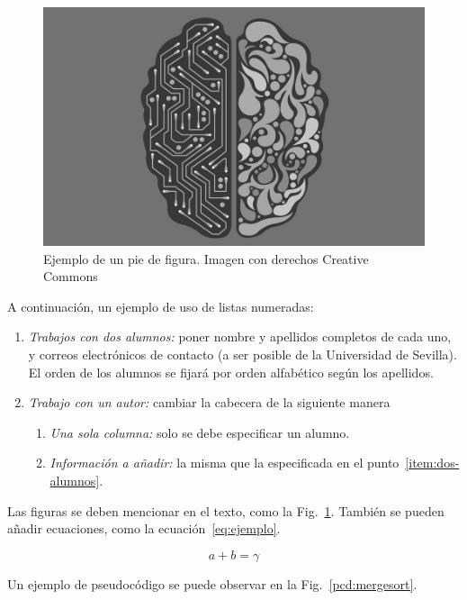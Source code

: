 \documentclass[conference,a4paper]{IEEEtran}
\def\figurename{Fig.}
\begin{document}
\begin{figure}
  \centering
  \includegraphics{ejemplo}
  \caption{Ejemplo de un pie de figura. Imagen con derechos Creative Commons}
  \label{fig:ejemplo}
\end{figure}

A continuación, un ejemplo de uso de listas numeradas:
\begin{enumerate}
\item\label{item:dos-alumnos} \textit{Trabajos con dos alumnos:} poner nombre y
  apellidos completos de cada uno, y correos electrónicos de contacto (a ser
  posible de la Universidad de Sevilla). El orden de los alumnos se fijará por
  orden alfabético según los apellidos.
\item \textit{Trabajo con un autor:} cambiar la cabecera de la siguiente manera
  \begin{enumerate}
  \item \textit{Una sola columna:} solo se debe especificar un alumno.
  \item \textit{Información a añadir:} la misma que la especificada en el
    punto~\ref{item:dos-alumnos}.
  \end{enumerate}
\end{enumerate}

Las figuras se deben mencionar en el texto, como la
\figurename~\ref{fig:ejemplo}. También se pueden añadir ecuaciones, como la
ecuación~\eqref{eq:ejemplo}.

\begin{equation}
  \label{eq:ejemplo}
  a + b = \gamma
\end{equation}

Un ejemplo de pseudocódigo se puede observar en la
\figurename~\ref{pcd:mergesort}.
\end{document}

